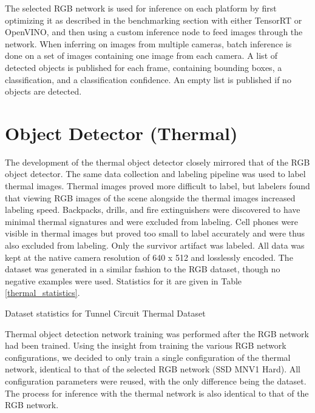 The selected RGB network is used for inference on each platform by first optimizing it as described in the benchmarking section with either TensorRT or OpenVINO, and then using a custom inference node to feed images through the network. When inferring on images from multiple cameras, batch inference is done on a set of images containing one image from each camera. A list of detected objects is published for each frame, containing bounding boxes, a classification, and a classification confidence. An empty list is published if no objects are detected.

\section{Object Detector (Thermal)}

The development of the thermal object detector closely mirrored that of the RGB object detector. The same data collection and labeling pipeline was used to label thermal images. Thermal images proved more difficult to label, but labelers found that viewing RGB images of the scene alongside the thermal images increased labeling speed. Backpacks, drills, and fire extinguishers were discovered to have minimal thermal signatures and were excluded from labeling. Cell phones were visible in thermal images but proved too small to label accurately and were thus also excluded from labeling. Only the survivor artifact was labeled. All data was kept at the native camera resolution of 640 x 512 and losslessly encoded. The dataset was generated in a similar fashion to the RGB dataset, though no negative examples were used. Statistics for it are given in Table \ref{thermal_statistics}.

\begin{table}
	\centering
	\begin{adjustbox}{max width=.9\textwidth}
	\end{adjustbox}
	\caption{Dataset statistics for Tunnel Circuit Thermal Dataset}
	\label{thermal_statistics}
\end{table}

Thermal object detection network training was performed after the RGB network had been trained. Using the insight from training the various RGB network configurations, we decided to only train a single configuration of the thermal network, identical to that of the selected RGB network (SSD MNV1 Hard). All configuration parameters were reused, with the only difference being the dataset. The process for inference with the thermal network is also identical to that of the RGB network.

